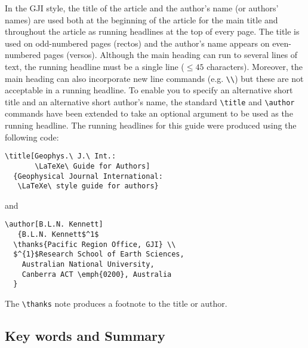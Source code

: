 In the GJI style, the title of the article and the author's name (or
authors' names) are used both at the beginning of the article for the
main title and throughout the article as running headlines at the top
of every page. The title is used on odd-numbered pages (rectos) and the
author's name appears on even-numbered pages (versos). Although the
main heading can run to several lines of text, the running headline
must be a single line ($\leqslant 45$ characters). Moreover, the main
heading can also incorporate new line commands (e.g. \verb"\\") but
these are not acceptable in a running headline. To enable you to
specify an alternative short title and an alternative short author's
name, the standard \verb"\title" and \verb"\author" commands have been
extended to take an optional argument to be used as the running
headline. The running headlines for this guide were produced using the
following code:
\begin{verbatim}
\title[Geophys.\ J.\ Int.:
       \LaTeXe\ Guide for Authors]
  {Geophysical Journal International:
   \LaTeXe\ style guide for authors}
\end{verbatim}
and
\begin{verbatim}
\author[B.L.N. Kennett]
   {B.L.N. Kennett$^1$
  \thanks{Pacific Region Office, GJI} \\
  $^{1}$Research School of Earth Sciences,
    Australian National University,
    Canberra ACT \emph{0200}, Australia
  }
\end{verbatim}
The \verb"\thanks" note produces a footnote to the title or author.

\subsection{Key words and Summary}


